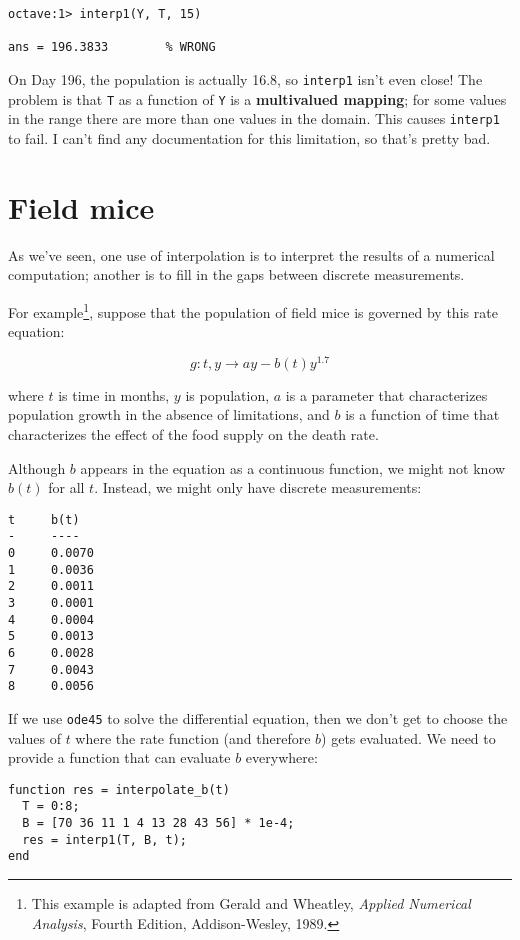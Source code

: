 \begin{verbatim}
octave:1> interp1(Y, T, 15)     

ans = 196.3833        % WRONG
\end{verbatim}

On Day 196, the population is actually 16.8, so {\tt interp1} isn't
even close! The problem is that {\tt T} as a function of {\tt Y} is a
{\bf multivalued mapping}; for some values in the range there are more
than one values in the domain. This causes {\tt interp1} to fail. I
can't find any documentation for this limitation, so that's pretty
bad.


\section{Field mice}

As we've seen, one use of interpolation is to interpret the results
of a numerical computation; another is to fill in the gaps between
discrete measurements.

For example\footnote{This example is adapted from Gerald and Wheatley,
{\em Applied Numerical Analysis}, Fourth Edition, Addison-Wesley,
1989.}, suppose that the population of field mice is governed by this
rate equation:

\[ g : t,y \to ay - b(t) y^{1.7} \]

where $t$ is time in months, $y$ is population, $a$ is a parameter
that characterizes population growth in the absence of limitations,
and $b$ is a function of time that characterizes the effect of the
food supply on the death rate.

Although $b$ appears in the equation as a continuous function, we
might not know $b(t)$ for all $t$. Instead, we might only have discrete
measurements:

\begin{verbatim}
t     b(t)
-     ----
0     0.0070
1     0.0036       
2     0.0011
3     0.0001
4     0.0004
5     0.0013
6     0.0028
7     0.0043
8     0.0056
\end{verbatim}

If we use {\tt ode45} to solve the differential equation, then we
don't get to choose the values of $t$ where the rate function
(and therefore $b$) gets evaluated. We need to provide a function
that can evaluate $b$ everywhere:

\begin{verbatim}
function res = interpolate_b(t)
  T = 0:8;
  B = [70 36 11 1 4 13 28 43 56] * 1e-4;
  res = interp1(T, B, t);
end
\end{verbatim}

